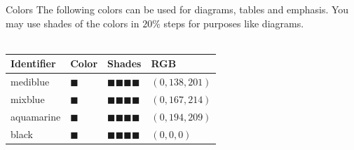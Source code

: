 \documentclass[aspectratio=1610,12pt]{beamer}
\begin{document}
\begin{frame}{Colors}
The following colors can be used for diagrams, tables and emphasis.
You may use shades of the colors in $20 \%$ steps for purposes like diagrams.\\
~\\
\centering
\scalebox{1.5}
{
\begin{tabulary}{\textwidth}{llll}
\toprule
Identifier	&Color					&Shades																		&RGB\\
\midrule
mediblue   	&\Huge\color{mediblue}$\blacksquare$	&\Huge\color{mediblue!80}$\blacksquare$\color{mediblue!60}$\blacksquare$\color{mediblue!40}$\blacksquare$\color{mediblue!20}$\blacksquare$	&$(0,138,201)$\\
mixblue   	&\Huge\color{mixblue}$\blacksquare$	&\Huge\color{mixblue!80}$\blacksquare$\color{mixblue!60}$\blacksquare$\color{mixblue!40}$\blacksquare$\color{mixblue!20}$\blacksquare$	&$(0,167,214)$\\
aquamarine	&\Huge\color{aquamarine}$\blacksquare$	&\Huge\color{aquamarine!80}$\blacksquare$\color{aquamarine!60}$\blacksquare$\color{aquamarine!40}$\blacksquare$\color{aquamarine!20}$\blacksquare$	&$(0,194,209)$\\
black		&\Huge\color{black}$\blacksquare$	&\Huge\color{black!80}$\blacksquare$\color{black!60}$\blacksquare$\color{black!40}$\blacksquare$\color{black!20}$\blacksquare$	&$(0,0,0)$\\
\bottomrule
\end{tabulary}
}
\end{frame}
\end{document}
